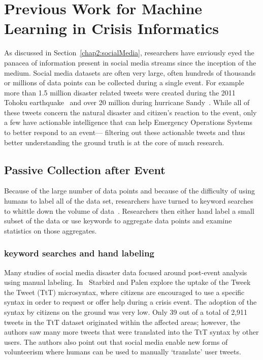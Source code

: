 \chapter{Previous Work for Machine Learning in Crisis Informatics}

As discussed in Section~\ref{chap2:socialMedia}, researchers have enviously eyed
the panacea of information present in social media streams since the inception
of the medium. Social media datasets are often very large, often hundreds of
thousands or millions of data points can be collected during a single event. For
example more than 1.5 million disaster related tweets were created during the
2011 Tohoku earthquake~\cite{doanAnalysisTwitterMessages2012} and over 20
million during hurricane Sandy~\cite{meierDigitalHumanitariansHow2015}. While
all of these tweets concern the natural disaster and citizen's reaction to the
event, only a few have actionable intelligence that can help Emergency
Operations Systems to better respond to an event--- filtering out these 
actionable tweets and thus better understanding the ground truth is at the core 
of much research. 

\section{Passive Collection after Event}
Because of the large number of data points and because of the difficulty of
using humans to label all of the data set, researchers have turned to keyword
searches to whittle down the volume of
data~\cite{doanAnalysisTwitterMessages2012}. Researchers then either hand label
a small subset of the data or use keywords to aggregate data points and examine
statistics on those aggregates.

\subsection{keyword searches and hand labeling}
Many studies of social media disaster data focused around post-event analysis
using manual labeling. In~\cite{starbirdVoluntweetersSelforganizingDigital}
Starbird and Palen explore the uptake of the Tweek the Tweet (TtT) microsyntax, where
citizens are encouraged to use a specific syntax in order to request or offer
help during a crisis event. The adoption of the syntax by citizens on the ground
was very low. Only 39 out of a total of 2,911 tweets in the TtT dataset originated within the affected
areas; however, the authors saw many more tweets that were translated into the
TtT syntax by other users. The authors also point out that social media enable new
forms of volunteerism where humans can be used to manually `translate' user tweets.

